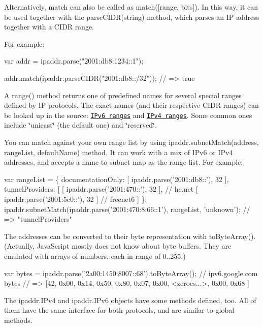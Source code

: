 Alternatively, {\ttfamily match} can also be called as {\ttfamily match(\mbox{[}range, bits\mbox{]})}. In this way, it can be used together with the {\ttfamily parse\+C\+I\+D\+R(string)} method, which parses an IP address together with a C\+I\+DR range.

For example\+:


\begin{DoxyCode}
var addr = ipaddr.parse("2001:db8:1234::1");

addr.match(ipaddr.parseCIDR("2001:db8::/32")); // => true
\end{DoxyCode}


A {\ttfamily range()} method returns one of predefined names for several special ranges defined by IP protocols. The exact names (and their respective C\+I\+DR ranges) can be looked up in the source\+: \href{https://github.com/whitequark/ipaddr.js/blob/master/src/ipaddr.coffee#L186}{\tt I\+Pv6 ranges} and \href{https://github.com/whitequark/ipaddr.js/blob/master/src/ipaddr.coffee#L71}{\tt I\+Pv4 ranges}. Some common ones include {\ttfamily \char`\"{}unicast\char`\"{}} (the default one) and {\ttfamily \char`\"{}reserved\char`\"{}}.

You can match against your own range list by using {\ttfamily ipaddr.\+subnet\+Match(address, range\+List, default\+Name)} method. It can work with a mix of I\+Pv6 or I\+Pv4 addresses, and accepts a name-\/to-\/subnet map as the range list. For example\+:


\begin{DoxyCode}
var rangeList = \{
  documentationOnly: [ ipaddr.parse('2001:db8::'), 32 ],
  tunnelProviders: [
    [ ipaddr.parse('2001:470::'), 32 ], // he.net
    [ ipaddr.parse('2001:5c0::'), 32 ]  // freenet6
  ]
\};
ipaddr.subnetMatch(ipaddr.parse('2001:470:8:66::1'), rangeList, 'unknown'); // => "tunnelProviders"
\end{DoxyCode}


The addresses can be converted to their byte representation with {\ttfamily to\+Byte\+Array()}. (Actually, Java\+Script mostly does not know about byte buffers. They are emulated with arrays of numbers, each in range of 0..255.)


\begin{DoxyCode}
var bytes = ipaddr.parse('2a00:1450:8007::68').toByteArray(); // ipv6.google.com
bytes // => [42, 0x00, 0x14, 0x50, 0x80, 0x07, 0x00, <zeroes...>, 0x00, 0x68 ]
\end{DoxyCode}


The {\ttfamily ipaddr.\+I\+Pv4} and {\ttfamily ipaddr.\+I\+Pv6} objects have some methods defined, too. All of them have the same interface for both protocols, and are similar to global methods.

